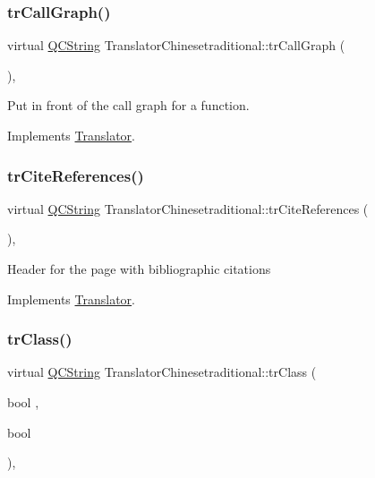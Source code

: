 \subsubsection{\texorpdfstring{trCallGraph()}{trCallGraph()}}
{\footnotesize\ttfamily virtual \mbox{\hyperlink{class_q_c_string}{Q\+C\+String}} Translator\+Chinesetraditional\+::tr\+Call\+Graph (\begin{DoxyParamCaption}{ }\end{DoxyParamCaption})\hspace{0.3cm}{\ttfamily [inline]}, {\ttfamily [virtual]}}

Put in front of the call graph for a function. 

Implements \mbox{\hyperlink{class_translator}{Translator}}.

\mbox{\label{class_translator_chinesetraditional_a3b2598c73b1ee59b57f88082508b86c1}} 
\subsubsection{\texorpdfstring{trCiteReferences()}{trCiteReferences()}}
{\footnotesize\ttfamily virtual \mbox{\hyperlink{class_q_c_string}{Q\+C\+String}} Translator\+Chinesetraditional\+::tr\+Cite\+References (\begin{DoxyParamCaption}{ }\end{DoxyParamCaption})\hspace{0.3cm}{\ttfamily [inline]}, {\ttfamily [virtual]}}

Header for the page with bibliographic citations 

Implements \mbox{\hyperlink{class_translator}{Translator}}.

\mbox{\label{class_translator_chinesetraditional_a667d8262125be0fcf73ca0d0343f84cf}} 
\subsubsection{\texorpdfstring{trClass()}{trClass()}}
{\footnotesize\ttfamily virtual \mbox{\hyperlink{class_q_c_string}{Q\+C\+String}} Translator\+Chinesetraditional\+::tr\+Class (\begin{DoxyParamCaption}\item[{bool}]{,  }\item[{bool}]{ }\end{DoxyParamCaption})\hspace{0.3cm}{\ttfamily [inline]}, {\ttfamily [virtual]}}

